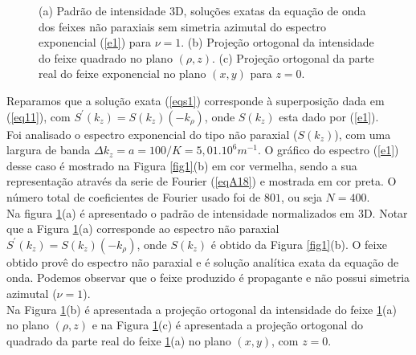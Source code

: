 \begin{figure}[h]
\centering
{}
\caption{(a) Padr\~ao de intensidade 3D, solu\c{c}\~oes exatas da equa\c{c}\~ao de onda dos feixes n\~ao paraxiais sem simetria azimutal do espectro exponencial (\ref{e1}) para $\nu=1$. (b) Proje\c{c}\~ao ortogonal da intensidade do feixe quadrado no plano $(\rho,z)$. (c) Proje\c{c}\~ao ortogonal da parte real do feixe exponencial no plano $(x,y)$ para $z=0$.}
\label{fig4}
\end{figure}
Reparamos que a solu\c{c}\~ao exata (\ref{eqs1}) corresponde \`a superposi\c{c}\~ao dada em (\ref{eq11}), com $S^{'}(k_z)=S(k_z)(-k_{\rho})$, onde $S(k_z)$ esta dado por (\ref{e1}).\\
Foi analisado o espectro exponencial do tipo n\~ao paraxial ($S(k_z)$), com uma largura de banda $\Delta k_z = a = 100/K = 5,01.10^6 m^{-1}$. O gr\'afico do espectro (\ref{e1}) desse caso \'e mostrado na Figura \ref{fig1}(b) em cor vermelha, sendo a sua representa\c{c}\~ao atrav\'es da serie de Fourier (\ref{eqA18}) e mostrada em cor preta. O n\'umero total de coeficientes de Fourier usado foi de $801$, ou seja $N=400$.\\
Na figura \ref{fig4}(a) \'e apresentado o padr\~ao de intensidade normalizados em 3D. Notar que a Figura \ref{fig4}(a) corresponde ao espectro n\~ao paraxial $S^{'}(k_z)=S(k_z)(-k_{\rho})$, onde $S(k_z)$ \'e obtido da Figura \ref{fig1}(b). O feixe obtido prov\^e do espectro n\~ao paraxial e \'e solu\c{c}\~ao anal\'itica exata da equa\c{c}\~ao de onda. Podemos observar que o feixe produzido \'e propagante e n\~ao possui simetria azimutal ($\nu=1$).\\
Na Figura \ref{fig4}(b) \'e apresentada a proje\c{c}\~ao ortogonal da intensidade do feixe \ref{fig4}(a) no plano $(\rho,z)$ e na Figura \ref{fig4}(c) \'e apresentada a proje\c{c}\~ao ortogonal do quadrado da parte real do feixe \ref{fig4}(a) no plano $(x,y)$, com $z=0$. 
